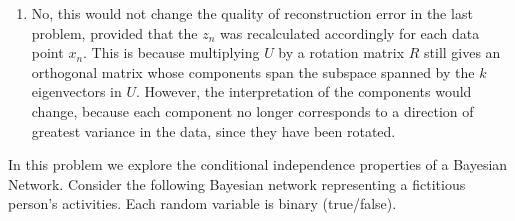 \documentclass[submit]{harvardml}
\newcommand{\attr}[1]{\textsf{#1}}
\begin{document}
\begin{enumerate}
  \item No, this would not change the quality of reconstruction error in the last problem, provided that the $z_n$ was recalculated accordingly for each data point $x_n$. This is because multiplying $U$ by a rotation matrix $R$ still gives an orthogonal matrix whose components span the subspace spanned by the $k$ eigenvectors in $U$. However, the interpretation of the components would change, because each component no longer corresponds to a direction of greatest variance in the data, since they have been rotated.
\end{enumerate}

\newpage

\begin{problem}

% 
% 

  
  \noindent In this problem we explore the conditional independence
  properties of a Bayesian Network.  Consider the following Bayesian
  network representing a fictitious person's activities. Each random
  variable is binary (true/false).

\begin{center}
\end{center}


\end{problem}
\end{document}
